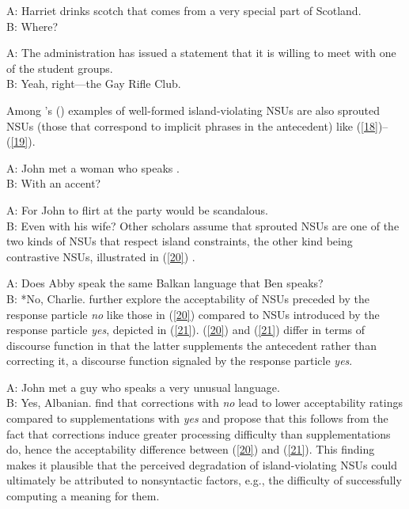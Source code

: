 \ea A: Harriet drinks scotch that comes from a very special part of Scotland.\\B: Where? \citep[245]{CJ2005a} \label{16}\z

\ea A: The administration has issued a statement that it is willing to meet with one of the student groups.\\B: Yeah, right---the Gay Rifle Club. \citep[245]{CJ2005a} \label{17}\z

Among \citeauthor{CJ2005a}'s (\citeyear[245]{CJ2005a}) examples of well-formed island-violating NSUs are also sprouted NSUs (those that correspond to implicit phrases in the antecedent) like (\ref{18})--(\ref{19}).

\ea A: John met a woman who speaks .\\B: With an  accent?\label{18}\z

\ea A: For John to flirt at the party would be scandalous. \\B: Even with his wife?\label{19}\z
Other scholars assume that sprouted NSUs are one of the two kinds of NSUs that respect island constraints, the other kind being contrastive NSUs, illustrated in (\ref{20}) \citep{Chung1995, Merchant2005a, Griffiths2014}.

\ea A: Does Abby speak the same Balkan language that Ben speaks?\\
B: *No, Charlie. \citep[688]{Merchant2005a}  \label{20}\z
%
\citet{Schmeh2015} further explore the acceptability of NSUs preceded by the response particle \textit{no} like those in (\ref{20}) compared to NSUs introduced by the response particle \textit{yes}, depicted in (\ref{21}). (\ref{20}) and (\ref{21}) differ in terms of discourse function in that the latter supplements the antecedent rather than correcting it, a discourse function signaled by the response particle \textit{yes}.

\ea A: John met a guy who speaks a very unusual language. \\B: Yes, Albanian. \citep[245]{CJ2005a} \label{21}\z
%
\citet{Schmeh2015} find that corrections with \textit{no} lead to
lower acceptability ratings compared to 
supplementations with \textit{yes} and propose that this follows from the fact that corrections induce greater processing difficulty than supplementations do, hence the acceptability difference between (\ref{20}) and (\ref{21}). This finding makes it plausible that the perceived degradation of island-violating NSUs could ultimately be attributed to nonsyntactic factors, e.g., the difficulty of successfully computing a meaning for them.

